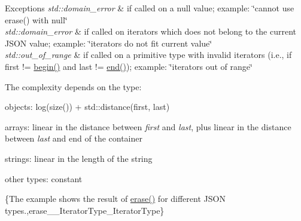 \begin{DoxyExceptions}{Exceptions}
{\em std\+::domain\+\_\+error} & if called on a {\ttfamily null} value; example\+: {\ttfamily \char`\"{}cannot
use erase() with null\char`\"{}} \\
\hline
{\em std\+::domain\+\_\+error} & if called on iterators which does not belong to the current J\+S\+ON value; example\+: {\ttfamily \char`\"{}iterators do not fit current value\char`\"{}} \\
\hline
{\em std\+::out\+\_\+of\+\_\+range} & if called on a primitive type with invalid iterators (i.\+e., if {\ttfamily first != \hyperlink{classnlohmann_1_1basic__json_ad4e381c54039607be08d7af41a1f6ad1}{begin()}} and {\ttfamily last != \hyperlink{classnlohmann_1_1basic__json_a12ccf14d39ddae52f6c7e126105a230b}{end()}}); example\+: {\ttfamily \char`\"{}iterators out of range\char`\"{}}\\
\hline
\end{DoxyExceptions}
The complexity depends on the type\+:
\begin{DoxyItemize}
\item objects\+: {\ttfamily log(size()) + std\+::distance(first, last)}
\item arrays\+: linear in the distance between {\itshape first} and {\itshape last}, plus linear in the distance between {\itshape last} and end of the container
\item strings\+: linear in the length of the string
\item other types\+: constant
\end{DoxyItemize}

\{The example shows the result of {\ttfamily \hyperlink{classnlohmann_1_1basic__json_ab9f8c9a02d6bb794ee26801a232ca4f4}{erase()}} for different J\+S\+ON types.,erase\+\_\+\+\_\+\+Iterator\+Type\+\_\+\+Iterator\+Type\}

